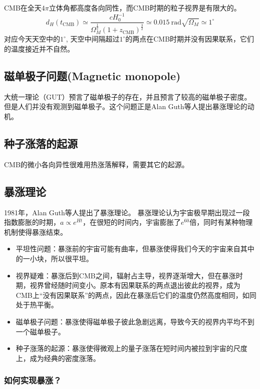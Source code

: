 \documentclass[12pt]{ctexart}
\begin{document}
CMB在全天$4\pi$立体角都高度各向同性，而CMB时期的粒子视界是有限大的。
\begin{equation}
    d_H (t_\text{CMB}) \simeq \frac{cH_0^{-1}}{\Omega_M^\frac{1}{2}\left(1+z_\text{CMB}\right)^\frac{3}{2} } \simeq 0.015 \mathrm{~rad} \sqrt{\Omega_M} \simeq 1^\circ 
\end{equation}
对应今天天空中的$1^\circ $, 天空中间隔超过$1^\circ $的两点在CMB时期并没有因果联系，它们的温度接近并不自然。

\subsection{磁单极子问题(Magnetic monopole)}

大统一理论（GUT）预言了磁单极子的存在，并且预言了较高的磁单极子密度。但是人们并没有观测到磁单极子。这个问题正是Alan Guth等人提出暴涨理论的动机。

\subsection{种子涨落的起源}

CMB的微小各向异性很难用热涨落解释，需要其它的起源。

\subsection{暴涨理论}

1981年，Alan Guth等人提出了暴涨理论。
暴涨理论认为宇宙极早期出现过一段指数膨胀的时期，$a\propto e^{Ht}$，在很短的时间内，宇宙膨胀了$e^{60}$倍，同时有某种物理机制使得暴涨结束。

\begin{itemize}
    \item 平坦性问题：暴涨前的宇宙可能有曲率，但暴涨使得我们今天的宇宙来自其中的一小块，所以很平坦。
    \item 视界疑难：暴涨后到CMB之间，辐射占主导，视界逐渐增大，但在暴涨时期，视界曾经随时间变小。原本有因果联系的两点退出彼此的视界，成为CMB上“没有因果联系”的两点，因此在暴涨后它们的温度仍然高度相同，如同处于热平衡。
    \item 磁单极子问题：暴涨使得磁单极子彼此急剧远离，导致今天的视界内平均不到一个磁单极子。
    \item 种子涨落的起源：暴涨使得微观上的量子涨落在短时间内被拉到宇宙的尺度上，成为经典的密度涨落。
\end{itemize}

\subsubsection*{如何实现暴涨？}
\end{document}
